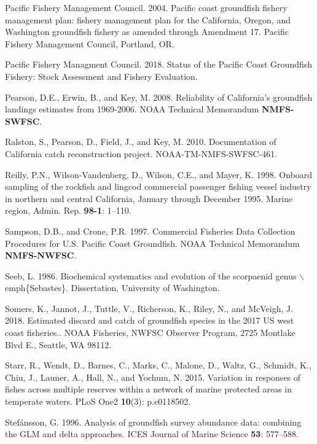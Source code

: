 \documentclass[12pt,]{article}
\begin{document}
\hypertarget{ref-PFMC2004}{}
Pacific Fishery Management Council. 2004. Pacific coast groundfish
fishery management plan: fishery management plan for the California,
Oregon, and Washington groundfish fishery as amended through Amendment
17. Pacific Fishery Management Council, Portland, OR.

\hypertarget{ref-PSMFC2018}{}
Pacific Fishery Managment Council. 2018. Status of the Pacific Coast
Groundfish Fishery: Stock Assessment and Fishery Evaluation.

\hypertarget{ref-Pearson2008}{}
Pearson, D.E., Erwin, B., and Key, M. 2008. Reliability of California's
groundfish landings estimates from 1969-2006. NOAA Technical Memorandum
\textbf{NMFS-SWFSC}.

\hypertarget{ref-Ralston2010}{}
Ralston, S., Pearson, D., Field, J., and Key, M. 2010. Documentation of
California catch reconstruction project. NOAA-TM-NMFS-SWFSC-461.

\hypertarget{ref-Reilly1998}{}
Reilly, P.N., Wilson-Vandenberg, D., Wilson, C.E., and Mayer, K. 1998.
Onboard sampling of the rockfish and lingcod commercial passenger
fishing vessel industry in northern and central California, January
through December 1995. Marine region, Admin. Rep. \textbf{98-1}: 1--110.

\hypertarget{ref-Sampson1997}{}
Sampson, D.B., and Crone, P.R. 1997. Commercial Fisheries Data
Collection Procedures for U.S. Pacific Coast Groundfish. NOAA Technical
Memorandum \textbf{NMFS-NWFSC}.

\hypertarget{ref-Seeb1986}{}
Seeb, L. 1986. Biochemical systematics and evolution of the scorpaenid
genus \(\backslash\)emph\{Sebastes\}. Dissertation, University of
Washington.

\hypertarget{ref-Somers2018}{}
Somers, K., Jannot, J., Tuttle, V., Richerson, K., Riley, N., and
McVeigh, J. 2018. Estimated discard and catch of groundfish species in
the 2017 US west coast fisheries.. NOAA Fisheries, NWFSC Observer
Program, 2725 Montlake Blvd E., Seattle, WA 98112.

\hypertarget{ref-Starr2015}{}
Starr, R., Wendt, D., Barnes, C., Marks, C., Malone, D., Waltz, G.,
Schmidt, K., Chiu, J., Launer, A., Hall, N., and Yochum, N. 2015.
Variation in responses of fishes across multiple reserves within a
network of marine protected areas in temperate waters. PLoS One2
\textbf{10}(3): p.e0118502.

\hypertarget{ref-Stefansson1996}{}
Stefánsson, G. 1996. Analysis of groundfish survey abundance data:
combining the GLM and delta approaches. ICES Journal of Marine Science
\textbf{53}: 577--588.
\end{document}
